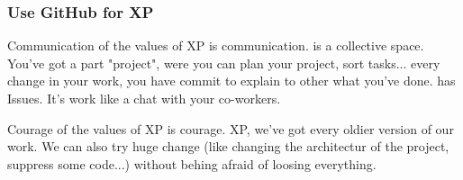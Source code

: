 \begin{frame}
    \frametitle{Use GitHub for XP}
    \begin{block}{Communication}
        \One of the values of XP is communication.
        \GitHub is a collective space. You've got a part "project", were you can plan your project, sort tasks...
        \For every change in your work, you have commit to explain to other what you've done.
        \GitHub has Issues. It's work like a chat with your co-workers.
    \end{block}\pause 
    \begin{block}{Courage} 
        \One of the values of XP is courage.
        \With XP, we've got every oldier version of our work. We can also try huge change (like changing the architectur of the project, suppress some code...) without behing afraid of loosing everything.
    \end{block}
\end{frame}

